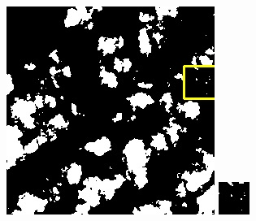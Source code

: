 \documentclass[UTF8]{ctexart}
\begin{document}
\begin{figure}[H]
{\begin{minipage}[b]{0.15\linewidth}
            \includegraphics[width=1\linewidth]{../log/cut/LC80980712014024LGN00_14882_mask.jpg}\vspace{4pt}
            \includegraphics[width=1\linewidth]{../log/cut/tmp_cut_LC80980712014024LGN00_14882_mask.jpg}

\end{minipage}}
\end{figure}
\end{document}
